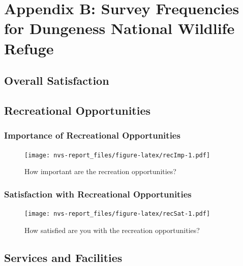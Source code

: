 \documentclass[]{book}
\begin{document}
\chapter*{Appendix B: Survey Frequencies for Dungeness National Wildlife
Refuge}\label{AppendixB}

\section*{Overall Satisfaction}\label{overall-satisfaction-1}

\section*{Recreational
Opportunities}\label{recreational-opportunities-1}

\subsection*{Importance of Recreational
Opportunities}\label{importance-of-recreational-opportunities}

\begin{figure}
\centering
\texttt{[image: nvs-report\_files/figure-latex/recImp-1.pdf]}
\caption{\label{fig:recImp}How important are the recreation opportunities?}
\end{figure}

\subsection*{Satisfaction with Recreational
Opportunities}\label{satisfaction-with-recreational-opportunities}

\begin{figure}
\centering
\texttt{[image: nvs-report\_files/figure-latex/recSat-1.pdf]}
\caption{\label{fig:recSat}How satisfied are you with the recreation
opportunities?}
\end{figure}

\section*{Services and Facilities}\label{services-and-facilities-1}
\end{document}
